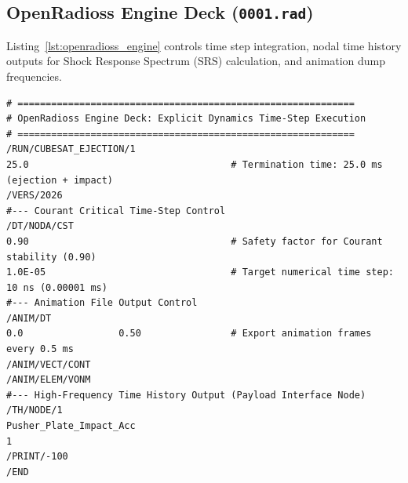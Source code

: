\subsection{OpenRadioss Engine Deck (\texttt{0001.rad})}

Listing~\ref{lst:openradioss_engine} controls time step integration, nodal time history outputs for Shock Response Spectrum (SRS) calculation, and animation dump frequencies.

\begin{lstlisting}[caption={OpenRadioss Engine Deck controlling explicit time-step integration and time-history output.}, label={lst:openradioss_engine}]
# ============================================================
# OpenRadioss Engine Deck: Explicit Dynamics Time-Step Execution
# ============================================================
/RUN/CUBESAT_EJECTION/1
25.0                                    # Termination time: 25.0 ms (ejection + impact)
/VERS/2026
#--- Courant Critical Time-Step Control
/DT/NODA/CST
0.90                                    # Safety factor for Courant stability (0.90)
1.0E-05                                 # Target numerical time step: 10 ns (0.00001 ms)
#--- Animation File Output Control
/ANIM/DT
0.0                 0.50                # Export animation frames every 0.5 ms
/ANIM/VECT/CONT
/ANIM/ELEM/VONM
#--- High-Frequency Time History Output (Payload Interface Node)
/TH/NODE/1
Pusher_Plate_Impact_Acc
1
/PRINT/-100
/END
\end{lstlisting}

